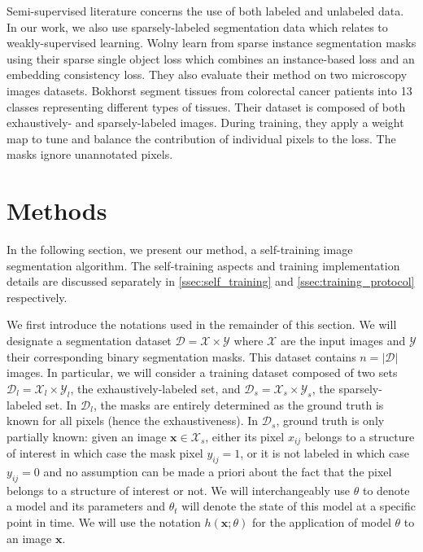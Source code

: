 Semi-supervised literature concerns the use of both labeled and unlabeled data. In our work, we also use sparsely-labeled segmentation data which relates to weakly-supervised learning. Wolny \etal \cite{wolny2021sparse} learn from sparse instance segmentation masks using their sparse single object loss which combines an instance-based loss and an embedding consistency loss. They also evaluate their method on two microscopy images datasets. Bokhorst \etal \cite{bokhorst2018learning} segment tissues from colorectal cancer patients into 13 classes representing different types of tissues. Their dataset is composed of both exhaustively- and sparsely-labeled images. During training, they apply a weight map to tune and balance the contribution of individual pixels to the loss. The masks ignore unannotated pixels.

\section{Methods}
\label{sec:methods}

In the following section, we present our method, a self-training image segmentation algorithm. The self-training aspects and training implementation details are discussed separately in \cref{ssec:self_training} and \cref{ssec:training_protocol}  respectively.

We first introduce the notations used in the remainder of this section. We will designate a segmentation dataset $\mathcal{D} = \mathcal{X} \times \mathcal{Y}$ where $\mathcal{X}$ are the input images and $\mathcal{Y}$ their corresponding binary segmentation masks. This dataset contains $n = |\mathcal{D}|$ images. In particular, we will consider a training dataset composed of two sets $\mathcal{D}_l = \mathcal{X}_l \times \mathcal{Y}_l$, the exhaustively-labeled set, and $\mathcal{D}_s = \mathcal{X}_s \times \mathcal{Y}_s$, the sparsely-labeled set. In $\mathcal{D}_l$, the masks are entirely determined as the ground truth is known for all pixels (hence the exhaustiveness). In $\mathcal{D}_s$, ground truth is only partially known: given an image $\mathbf{x} \in \mathcal{X}_s$, either its pixel $x_{ij}$ belongs to a structure of interest in which case the mask pixel $y_{ij} = 1$, or it is not labeled in which case $y_{ij} = 0$ and no assumption can be made a priori about the fact that the pixel belongs to a structure of interest or not. We will interchangeably use $\theta$ to denote a model and its parameters and $\theta_t$ will denote the state of this model at a specific point in time. We will use the notation $h(\mathbf{x};\theta)$ for the application of model $\theta$ to an image $\mathbf{x}$.


